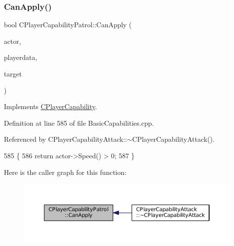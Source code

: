 \subsubsection{\texorpdfstring{Can\+Apply()}{CanApply()}}
{\footnotesize\ttfamily bool C\+Player\+Capability\+Patrol\+::\+Can\+Apply (\begin{DoxyParamCaption}\item[{std\+::shared\+\_\+ptr$<$ \hyperlink{classCPlayerAsset}{C\+Player\+Asset} $>$}]{actor,  }\item[{std\+::shared\+\_\+ptr$<$ \hyperlink{classCPlayerData}{C\+Player\+Data} $>$}]{playerdata,  }\item[{std\+::shared\+\_\+ptr$<$ \hyperlink{classCPlayerAsset}{C\+Player\+Asset} $>$}]{target }\end{DoxyParamCaption})\hspace{0.3cm}{\ttfamily [virtual]}}



Implements \hyperlink{classCPlayerCapability_ae96263e0950f496492f8baeb877b9554}{C\+Player\+Capability}.



Definition at line 585 of file Basic\+Capabilities.\+cpp.



Referenced by C\+Player\+Capability\+Attack\+::$\sim$\+C\+Player\+Capability\+Attack().


\begin{DoxyCode}
585                                                                                                            
                                                   \{
586     \textcolor{keywordflow}{return} actor->Speed() > 0;
587 \}
\end{DoxyCode}
Here is the caller graph for this function\+:\nopagebreak
\begin{figure}[H]
\begin{center}
\leavevmode
\includegraphics[width=350pt]{classCPlayerCapabilityPatrol_a63c099d931e1e57db01120db7b1fdbe4_icgraph}
\end{center}
\end{figure}
\hypertarget{classCPlayerCapabilityPatrol_a48e60ecd544759f3aad66afeb4a6e0a9}{}\label{classCPlayerCapabilityPatrol_a48e60ecd544759f3aad66afeb4a6e0a9} 
